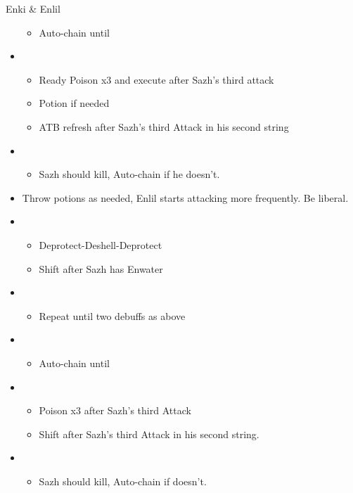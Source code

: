 \begin{battle}[1:43]{Enki \& Enlil}
\begin{itemize}
\begin{itemize}
				      \item Auto-chain until \stagger
			      \end{itemize}
			\item \sixth
			      \begin{itemize}
				      \item Ready Poison x3 and execute after Sazh's third attack
				      \item Potion if needed
				      \item ATB refresh after Sazh's third Attack in his second string
			      \end{itemize}
			\item \first
			      \begin{itemize}
				      \item Sazh should kill, Auto-chain if he doesn't.
			      \end{itemize}
			\item Throw potions as needed, Enlil starts attacking more frequently. Be liberal.
			\item \third
			      \begin{itemize}
				      \item Deprotect-Deshell-Deprotect
				      \item Shift after Sazh has Enwater
			      \end{itemize}
			\item \fifth
			      \begin{itemize}
				      \item Repeat until two debuffs as above
			      \end{itemize}
			\item \fourth
			      \begin{itemize}
				      \item Auto-chain until \stagger
			      \end{itemize}
			\item \sixth
			      \begin{itemize}
				      \item Poison x3 after Sazh's third Attack
				      \item Shift after Sazh's third Attack in his second string.
			      \end{itemize}
			\item \first
			      \begin{itemize}
				      \item Sazh should kill, Auto-chain if doesn't.
			      \end{itemize}
		\end{itemize}
\end{battle}
